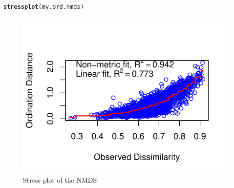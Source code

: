 \documentclass[12pt]{article}\usepackage[]{graphicx}\usepackage[]{color}
\makeatletter
\def\maxwidth{ %
  \ifdim\Gin@nat@width>\linewidth
    \linewidth
  \else
    \Gin@nat@width
  \fi
}
\newcommand{\hlstd}[1]{\textcolor[rgb]{0.345,0.345,0.345}{#1}}%
\newcommand{\hlkwd}[1]{\textcolor[rgb]{0.737,0.353,0.396}{\textbf{#1}}}%
\newenvironment{kframe}{%
 \def\at@end@of@kframe{}%
 \ifinner\ifhmode%
  \def\at@end@of@kframe{\end{minipage}}%
  \begin{minipage}{\columnwidth}%
 \fi\fi%
 \def\FrameCommand##1{\hskip\@totalleftmargin \hskip-\fboxsep
 \colorbox{shadecolor}{##1}\hskip-\fboxsep
     \hskip-\linewidth \hskip-\@totalleftmargin \hskip\columnwidth}%
 \MakeFramed {\advance\hsize-\width
   \@totalleftmargin\z@ \linewidth\hsize
   \@setminipage}}%
 {\par\unskip\endMakeFramed%
 \at@end@of@kframe}
\newenvironment{knitrout}{}{} %
\numberwithin{figure}{section}
\makeatother
\begin{document}
\begin{knitrout}\small
{}\color{fgcolor}\begin{kframe}
\begin{alltt}
\hlkwd{stressplot}\hlstd{(my.ord.nmds)}
\end{alltt}
\end{kframe}\begin{figure}

{\centering \includegraphics[width=\maxwidth]{figure/unnamed-chunk-52-1} 

}

\caption[Stress plot of the NMDS]{Stress plot of the NMDS}\label{fig:unnamed-chunk-52}
\end{figure}


\end{knitrout}
\end{document}
